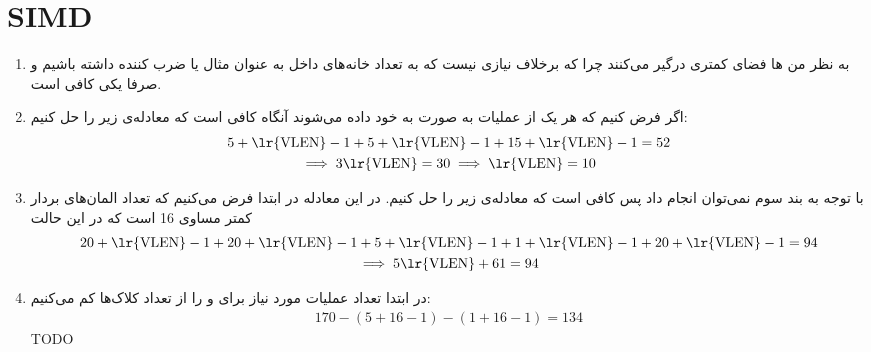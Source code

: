 \section{SIMD}
\begin{enumerate}
    \item به نظر من ها فضای کمتری درگیر می‌کنند
    چرا که برخلاف  نیازی نیست که
    به تعداد خانه‌های داخل
    به عنوان مثال
     یا ضرب کننده
    داشته باشیم و صرفا یکی کافی است.
    \item اگر فرض کنیم که هر یک از عملیات به صورت
    به خود
    داده می‌شوند آنگاه کافی است که معادله‌ی زیر را حل کنیم:
    \begin{gather*}
        5 + \text{\lr{VLEN}} - 1 + 5 + \text{\lr{VLEN}} - 1 + 15 + \text{\lr{VLEN}} - 1 = 52\\
        \implies 3 \text{\lr{VLEN}} = 30 \implies \text{\lr{VLEN}} = 10
    \end{gather*}
    \item با توجه به بند سوم نمی‌توان  انجام داد پس کافی است که معادله‌ی زیر را حل کنیم.
    در این معادله در ابتدا فرض می‌کنیم که تعداد المان‌های بردار کمتر مساوی 16 است که در این حالت
    \begin{gather*}
        20 + \text{\lr{VLEN}} - 1 + 20 + \text{\lr{VLEN}} - 1 + 5 + \text{\lr{VLEN}} - 1 + 1 + \text{\lr{VLEN}} - 1 + 20 + \text{\lr{VLEN}} - 1 = 94\\
        \implies 5 \text{\lr{VLEN}} + 61 = 94
    \end{gather*}
    \item در ابتدا تعداد عملیات مورد نیاز برای
     و 
    را از تعداد کلاک‌ها کم می‌کنیم:
    \begin{gather*}
        170 - (5 + 16 - 1) - (1 + 16 - 1) = 134
    \end{gather*}
    TODO
\end{enumerate}